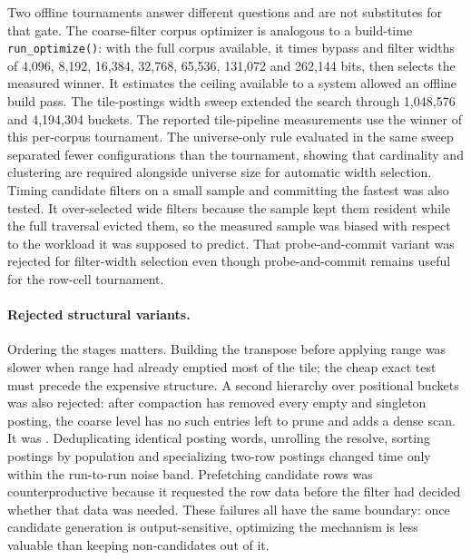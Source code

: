 Two offline tournaments answer different questions and are not substitutes for that gate. The
coarse-filter corpus optimizer is analogous to a build-time \texttt{run\_optimize()}: with the full
corpus available, it times bypass and filter widths of 4,096, 8,192, 16,384, 32,768, 65,536, 131,072
and 262,144 bits, then selects the measured winner. It estimates the ceiling available to a system
allowed an offline build pass. The tile-postings width sweep extended the search through 1,048,576
and 4,194,304 buckets. The reported tile-pipeline measurements use the winner of this per-corpus
tournament. The universe-only rule evaluated in the same sweep separated fewer configurations than
the tournament, showing that cardinality and clustering are required alongside universe size for
automatic width selection.
Timing candidate filters on a small sample and committing the fastest was also tested. It
over-selected wide filters because the
sample kept them resident while the full traversal evicted them, so the measured sample was biased
with respect to the workload it was supposed to predict. That probe-and-commit variant was rejected
for filter-width selection even though probe-and-commit remains useful for the row-cell tournament.

\paragraph*{Rejected structural variants.}
Ordering the stages matters. Building the transpose before applying range was slower when range had
already emptied most of the tile; the cheap exact test must precede the expensive structure. A second
hierarchy over positional buckets was also rejected: after compaction has removed every empty and
singleton posting, the coarse level has no such entries left to prune and adds a dense scan. It was
. Deduplicating
identical posting words, unrolling the resolve, sorting postings by population and specializing
two-row postings changed time only within the run-to-run noise band. Prefetching candidate rows was
counterproductive because it requested the row data before the filter had decided whether that data
was needed. These failures all have the same boundary: once candidate generation is output-sensitive,
optimizing the mechanism is less valuable than keeping non-candidates out of it.

